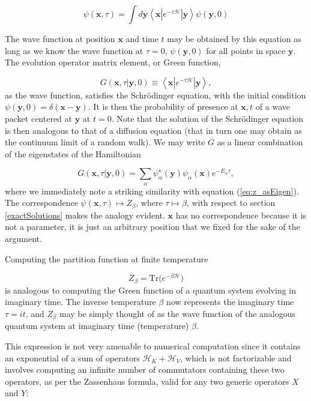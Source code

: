 \begin{equation}
\psi ( \bm x , \tau ) = \int d\bm y \left\langle \bm x | e^{-\tau \mathcal{H}} | \bm y \right\rangle \psi (\bm y, 0)
\end{equation}

The wave function at position $\bm x$ and time $t$ may be obtained by this equation as long as we know the wave function at $\tau = 0$, $\psi (\bm y, 0)$ for all points in space $\bm y$. The evolution operator matrix element, or Green function, 

\begin{equation}
G ( \bm x, \tau | \bm y, 0 ) \equiv \left\langle \bm x | e^{-\tau \mathcal{H}} | \bm y \right\rangle ,
\end{equation}
as the wave function, satisfies the Schr\"odinger equation, with the initial condition $\psi (\bm y, 0) = \delta (\bm x - \bm y )$. It is then the probability of presence at $\bm x, t$ of a wave packet centered at $\bm y$ at $t = 0$. Note that the solution of the Schr\"odinger equation is then analogous to that of a diffusion equation (that in turn one may obtain as the continuum limit of a random walk). We may write $G$ as a linear combination of the eigenstates of the Hamiltonian

\begin{equation}
G (\bm x, \tau | \bm y, 0) = \sum_\alpha \psi_\alpha^\star (\bm y) \psi_\alpha (\bm x) e^{-E_\alpha \tau} ,
\end{equation}
where we immediately note a striking similarity with equation (\ref{eq:z_asEigen}). The correspondence $\psi (\bm x, \tau) \mapsto Z_\beta$, where $\tau \mapsto \beta$, with respect to section \ref{exactSolutions} makes the analogy evident. $\bm x$ has no correspondence because it is not a parameter, it is just an arbitrary position that we fixed for the sake of the argument.

Computing the partition function at finite temperature

\begin{equation}
Z_\beta = \text{Tr} \big( e^{-\beta \mathcal{H} } \big)
\end{equation}
is analogous to computing the Green function of a quantum system evolving in imaginary time. The inverse temperature $\beta$ now represents the imaginary time $\tau = it$, and $Z_\beta$ may be simply thought of as the wave function of the analogous quantum system at imaginary time (temperature) $\beta$.
 
This expression is not very amenable to numerical computation since it contains an exponential of a sum of operators $\mathcal{H}_K + \mathcal{H}_V$, which is not factorizable and involves computing an infinite number of commutators containing these two operators, as per the Zassenhaus formula, valid for any two generic operators $X$ and $Y$:

